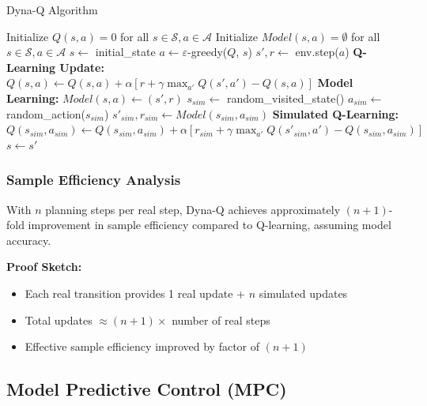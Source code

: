 \documentclass[12pt]{article}
\numberwithin{equation}{section}
\numberwithin{figure}{section}
\numberwithin{table}{section}
\numberwithin{algorithm}{section}
\begin{document}
{{{\begin{algorithm}[H]
\caption{Dyna-Q Algorithm}
\begin{algorithmic}[1]
\STATE Initialize $Q(s,a) = 0$ for all $s \in \mathcal{S}, a \in \mathcal{A}$
\STATE Initialize $Model(s,a) = \emptyset$ for all $s \in \mathcal{S}, a \in \mathcal{A}$
    \STATE $s \leftarrow$ initial\_state
        \STATE $a \leftarrow \varepsilon$-greedy($Q$, $s$)
        \STATE $s', r \leftarrow$ env.step($a$)
        \STATE \textbf{Q-Learning Update:} $Q(s,a) \leftarrow Q(s,a) + \alpha[r + \gamma \max_{a'} Q(s',a') - Q(s,a)]$
        \STATE \textbf{Model Learning:} $Model(s,a) \leftarrow (s', r)$
            \STATE $s_{sim} \leftarrow$ random\_visited\_state()
            \STATE $a_{sim} \leftarrow$ random\_action($s_{sim}$)
            \STATE $s'_{sim}, r_{sim} \leftarrow Model(s_{sim}, a_{sim})$
            \STATE \textbf{Simulated Q-Learning:} $Q(s_{sim}, a_{sim}) \leftarrow Q(s_{sim}, a_{sim}) + \alpha[r_{sim} + \gamma \max_{a'} Q(s'_{sim}, a') - Q(s_{sim}, a_{sim})]$
        \ENDFOR
        \STATE $s \leftarrow s'$
    \ENDWHILE
\ENDFOR
\end{algorithmic}
\end{algorithm}

\subsubsection{Sample Efficiency Analysis}
\begin{theorem}
With $n$ planning steps per real step, Dyna-Q achieves approximately $(n+1)$-fold improvement in sample efficiency compared to Q-learning, assuming model accuracy.
\end{theorem}

\textbf{Proof Sketch:}
\begin{itemize}
    \item Each real transition provides 1 real update + $n$ simulated updates
    \item Total updates $\approx (n+1) \times$ number of real steps
    \item Effective sample efficiency improved by factor of $(n+1)$
\end{itemize}

\subsection{Model Predictive Control (MPC)}

}}}
\end{document}
